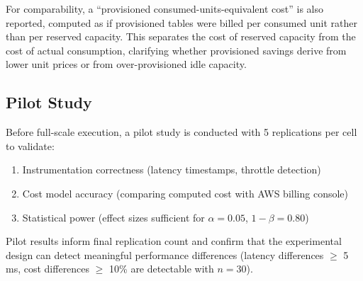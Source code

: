 For comparability, a ``provisioned consumed-units-equivalent cost'' is also reported, computed as if provisioned tables were billed per consumed unit rather than per reserved capacity. This separates the cost of reserved capacity from the cost of actual consumption, clarifying whether provisioned savings derive from lower unit prices or from over-provisioned idle capacity.

\subsection{Pilot Study}

Before full-scale execution, a pilot study is conducted with 5 replications per cell to validate:

\begin{enumerate}
    \item Instrumentation correctness (latency timestamps, throttle detection)
    \item Cost model accuracy (comparing computed cost with AWS billing console)
    \item Statistical power (effect sizes sufficient for $\alpha = 0.05$, $1-\beta = 0.80$)
\end{enumerate}

Pilot results inform final replication count and confirm that the experimental design can detect meaningful performance differences (latency differences $\geq$ 5 ms, cost differences $\geq$ 10\% are detectable with $n = 30$).
